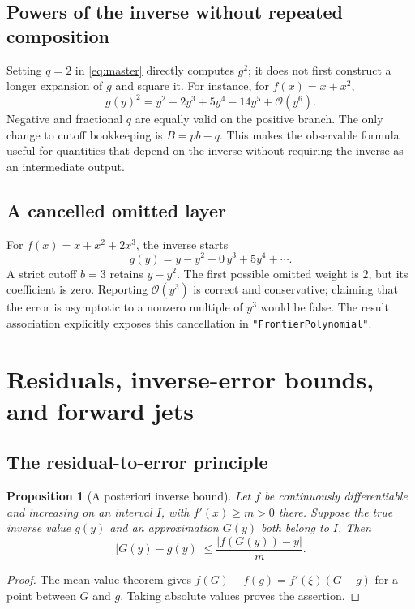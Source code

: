 \documentclass[11pt,a4paper]{article}
\numberwithin{equation}{section}
\newtheorem{proposition}[theorem]{Proposition}
\theoremstyle{definition}\newtheorem{definition}[theorem]{Definition}
\theoremstyle{remark}\newtheorem{remark}[theorem]{Remark}
\newcommand{\OO}{\mathcal O}\newcommand{\dd}{\mathrm d}
\newcommand{\code}[1]{\texttt{#1}}
\begin{document}
\subsection{Powers of the inverse without repeated composition}

Setting $q=2$ in \cref{eq:master} directly computes $g^2$; it does not
first construct a longer expansion of $g$ and square it. For instance,
for $f(x)=x+x^2$,
\[
 g(y)^2=y^2-2y^3+5y^4-14y^5+\OO(y^6).
\]
Negative and fractional $q$ are equally valid on the positive branch.
The only change to cutoff bookkeeping is $B=pb-q$. This makes the
observable formula useful for quantities that depend on the inverse
without requiring the inverse as an intermediate output.

\subsection{A cancelled omitted layer}

For $f(x)=x+x^2+2x^3$, the inverse starts
\[
 g(y)=y-y^2+0\,y^3+5y^4+\cdots.
\]
A strict cutoff $b=3$ retains $y-y^2$. The first possible omitted weight
is $2$, but its coefficient is zero. Reporting $\OO(y^3)$ is correct and
conservative; claiming that the error is asymptotic to a nonzero multiple
of $y^3$ would be false. The result association explicitly exposes this
cancellation in \code{"FrontierPolynomial"}.

\section{Residuals, inverse-error bounds, and forward jets}
\label{sec:residual}

\subsection{The residual-to-error principle}

\begin{proposition}[A posteriori inverse bound]
\label{prop:residual}
Let $f$ be continuously differentiable and increasing on an interval
$I$, with $f'(x)\ge m>0$ there. Suppose the true inverse value $g(y)$ and
an approximation $G(y)$ both belong to $I$. Then
\begin{equation}
 |G(y)-g(y)|\le\frac{|f(G(y))-y|}{m}.
 \label{eq:residual-bound}
\end{equation}
\end{proposition}
\begin{proof}
The mean value theorem gives $f(G)-f(g)=f'(\xi)(G-g)$ for a point between
$G$ and $g$. Taking absolute values proves the assertion.
\end{proof}
\end{document}
